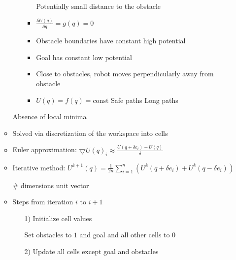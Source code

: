 \begin{itemize}
\begin{itemize}
\begin{itemize}
\begin{itemize}
                            \icon Potentially small distance to the obstacle
                            \item $\frac{\partial U(q)}{\partial q} = g(q) = 0$
                        \end{itemize}
                        \begin{itemize}
                            \item Obstacle boundaries have constant high potential
                            \item Goal has constant low potential
                            \item Close to obstacles, robot moves perpendicularly away from obstacle
                            \item $U(q) = f(q) = \text{const}$
                            \ipro Safe paths
                            \icon Long paths
                        \end{itemize}
                \end{itemize}
            \ipro Absence of local minima
            \item Solved via discretization of the workspace into cells
            \item Euler approximation: $\bigtriangledown U(q)_i \approx \frac{U(q + \delta e_i) - U(q)}{\delta}$
            \item Iterative method: $U^{k+1}(q) = \frac{1}{2n} \sum_{i=1}^{n} (U^k(q + \delta e_i) + U^k(q - \delta e_i))$\\
                \begin{itemize*}
                     \# dimensions
                     unit vector
                \end{itemize*}
            \item Steps from iteration $i$ to $i+1$ 
                \begin{itemize}
                    \item[1)] Initialize cell values
                        \begin{itemize}
                             Set obstacles to $1$ and goal and all other cells to $0$
                        \end{itemize}
                    \item[2)] Update all cells except goal and obstacles
                        \begin{itemize}

\end{itemize}
\end{itemize}
\end{itemize}
\end{itemize}
